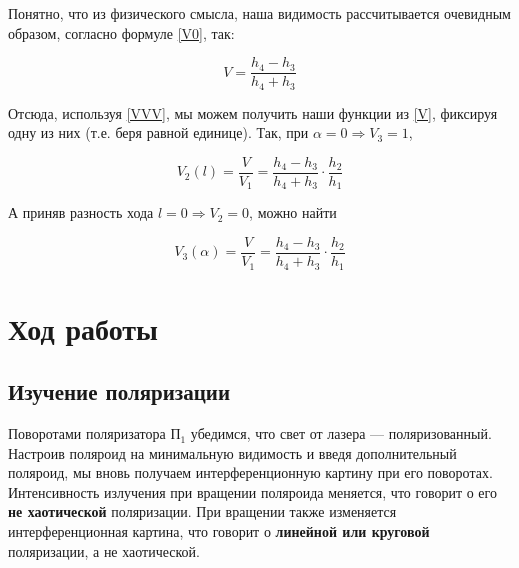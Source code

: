\documentclass[a4paper,12pt]{article} %
\begin{document}
Понятно, что из физического смысла, наша видимость рассчитывается очевидным образом, согласно формуле \eqref{V0}, так:

\begin{equation}\label{V}
V = \dfrac{h_4 - h_3}{h_4 + h_3}
\end{equation}

Отсюда, используя \eqref{VVV}, мы можем получить наши функции из \eqref{V}, фиксируя одну из них (т.е. беря равной единице). Так, при $ \alpha = 0 \Rightarrow V_3 = 1 $, 

\begin{equation}\label{V2}
V_2 (l) = \dfrac{V}{V_1} = \dfrac{h_4 - h_3}{h_4 + h_3} \cdot \dfrac{h_2}{h_1}
\end{equation}

А приняв разность хода $ l = 0 \Rightarrow V_2 = 0 $, можно найти 

\begin{equation}\label{V_3}
V_3(\alpha) = \dfrac{V}{V_1} = \dfrac{h_4 - h_3}{h_4 + h_3} \cdot \dfrac{h_2}{h_1}
\end{equation}


\section{Ход работы}


\subsection{Изучение поляризации}

Поворотами поляризатора $ \text{П}_1 $ убедимся, что свет от лазера --- поляризованный. Настроив поляроид на минимальную видимость и введя дополнительный поляроид, мы вновь получаем интерференционную картину при его поворотах. Интенсивность излучения при вращении поляроида меняется, что говорит о его \textbf{не хаотической} поляризации. При вращении также изменяется интерференционная картина, что говорит о \textbf{линейной или круговой} поляризации, а не хаотической.
\end{document}
